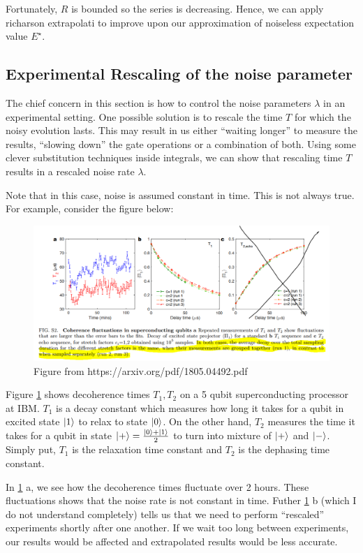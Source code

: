 \documentclass{article}
\begin{document}
Fortunately, \(R\) is bounded so the series is decreasing. Hence, we can apply
richarson extrapolati to improve upon our approximation of noiseless
expectation value \(E^\star\).
\subsection{Experimental Rescaling of the noise parameter}
The chief concern in this section is how to control the noise
parameters \(\lambda\) in an experimental setting. One possible solution
is to rescale the time \(T\) for which the noisy evolution lasts. This
may result in us either ``waiting longer'' to measure the results, ``slowing down''
the gate operations or a combination of both. Using some clever substitution techniques inside integrals,
we can show that rescaling time \(T\) results in a rescaled noise rate
 \(\lambda\).

 Note that in this case, noise is assumed constant in time. This is not always true. For example,
 consider the figure below:
\begin{figure}[!htb]
	\centering
	\includegraphics[width=1.4\textwidth]{img/main-f791e832.png}
	\caption{Figure from https://arxiv.org/pdf/1805.04492.pdf}
	\label{fig1}
\end{figure}

Figure \ref{fig1} shows decoherence times \(T_1, T_2\) on a 5 qubit superconducting
processor at IBM. \(T_1\) is a decay constant which measures how long it takes for a qubit
in excited state \(\ket{1}\) to relax to state \(\ket{0}\). On the other hand, \(T_2\)
measures the time it takes for a qubit in state \(\ket{+} = \frac{\ket{0}+ \ket{1}}{2}\) to turn into mixture of \(\ket{+}\) and \(\ket{-}\). Simply put,
\(T_1\) is the relaxation time constant and \(T_2\) is the dephasing time constant.

In \ref{fig1} a, we see how the decoherence times fluctuate over 2 hours. These
fluctuations shows that the noise rate is not constant in time. Futher \ref{fig1} b
(which I do not understand completely) tells us that we need to perform ``rescaled''
experiments shortly after one another. If we wait too long between experiments,
our results would be affected and extrapolated results would be less accurate.
\end{document}
